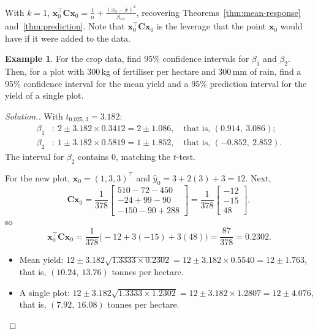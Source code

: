 \documentclass[11pt,a4paper]{article}
\numberwithin{equation}{section}
\theoremstyle{definition}
\newtheorem{exa}[thm]{Example}
\newenvironment{solution}
  {\renewcommand{\qedsymbol}{}\begin{proof}[\textit{Solution}.]}
  {\end{proof}}
\begin{document}
With $k = 1$, $\mathbf{x}_0^\top\mathbf{C}\mathbf{x}_0 = \frac1n + \frac{(x_0 - \bar x)^2}{S_{xx}}$,
recovering Theorems~\ref{thm:mean-response} and~\ref{thm:prediction}. Note that
$\mathbf{x}_0^\top\mathbf{C}\mathbf{x}_0$ is the leverage that the point $\mathbf{x}_0$ would
have if it were added to the data.

\begin{exa}\label{exa:crop-intervals}
For the crop data, find 95\% confidence intervals for $\beta_1$ and $\beta_2$. Then, for a plot
with $300$\,kg of fertiliser per hectare and $300$\,mm of rain, find a 95\% confidence interval
for the mean yield and a 95\% prediction interval for the yield of a single plot.
\end{exa}

\begin{solution}
With $t_{0.025,3} = 3.182$:
\begin{align*}
\beta_1&\colon\ 2 \pm 3.182 \times 0.3412 = 2 \pm 1.086, \quad\text{that is, } (0.914,\ 3.086); \\
\beta_2&\colon\ 1 \pm 3.182 \times 0.5819 = 1 \pm 1.852, \quad\text{that is, } (-0.852,\ 2.852).
\end{align*}
The interval for $\beta_2$ contains $0$, matching the $t$-test.

For the new plot, $\mathbf{x}_0 = (1, 3, 3)^\top$ and $\hat y_0 = 3 + 2(3) + 3 = 12$. Next,
\[
\mathbf{C}\mathbf{x}_0 = \frac{1}{378}\begin{bmatrix} 510 - 72 - 450 \\ -24 + 99 - 90 \\ -150 - 90 + 288 \end{bmatrix}
= \frac{1}{378}\begin{bmatrix} -12 \\ -15 \\ 48 \end{bmatrix},
\]
so
\[
\mathbf{x}_0^\top\mathbf{C}\mathbf{x}_0 = \frac{1}{378}\bigl(-12 + 3(-15) + 3(48)\bigr) = \frac{87}{378} = 0.2302 .
\]
\begin{itemize}
\item Mean yield: $12 \pm 3.182\sqrt{1.3333 \times 0.2302} = 12 \pm 3.182 \times 0.5540 = 12 \pm 1.763$,
that is, $(10.24,\ 13.76)$ tonnes per hectare.
\item A single plot: $12 \pm 3.182\sqrt{1.3333 \times 1.2302} = 12 \pm 3.182 \times 1.2807 = 12 \pm 4.076$,
that is, $(7.92,\ 16.08)$ tonnes per hectare.
\end{itemize}
\end{solution}
\end{document}
